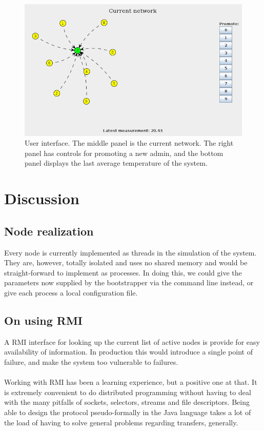 \documentclass[10pt,a4paper]{article}
\begin{document}
\begin{figure}[h]
\centering
\includegraphics[scale=0.4]{fig/UI.png}
 \caption{User interface. The middle panel is the current network. The right panel has controls for promoting a new admin, and the bottom panel displays the last average temperature of the system.}
 \label{fig:ui}
\end{figure}


\section{Discussion}

\subsection{Node realization}
Every node is currently implemented as threads in the simulation of the system. They are, however, totally isolated and uses no shared memory and would be straight-forward to implement as processes. In doing this, we could give the parameters now supplied by the bootstrapper via the command line instead, or give each process a local configuration file.

\subsection{On using RMI}
A RMI interface for looking up the current list of active nodes is provide for easy availability of information. In production this would introduce a single point of failure, and make the system too vulnerable to failures.\\\\
Working with RMI has been a learning experience, but a positive one at that. It is extremely convenient to do distributed programming without having to deal with the many pitfalls of sockets, selectors, streams and file descriptors. Being able to design the protocol pseudo-formally in the Java language takes a lot of the load of having to solve general problems regarding transfers, generally.
\end{document}
